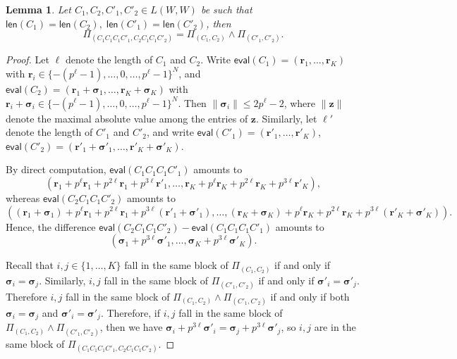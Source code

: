 \documentclass[letterpaper, 11pt, thm-restate]{article}
\numberwithin{equation}{section}
\newcommand{\br}{\boldsymbol{r}}
\newcommand{\bz}{\boldsymbol{z}}
\newcommand{\bsig}{\boldsymbol{\sigma}}
\newcommand{\len}{\mathsf{len}}
\newcommand{\eval}{\mathsf{eval}}
\newtheorem{lem}[thrm]{Lemma}
\theoremstyle{definition}
\theoremstyle{definition}
\theoremstyle{definition}
\begin{document}
\begin{lem}\label{lem:meet}
    Let $C_1, C_2, C'_1, C'_2 \in L(W, W)$ be such that $\len(C_1) = \len(C_2),\; \len(C'_1) = \len(C'_2)$, then
    \begin{equation*}
        \Pi_{(C_1C_1C_1C'_1, C_2C_1C_1C'_2)} = \Pi_{(C_1, C_2)} \wedge \Pi_{(C'_1, C'_2)}.
    \end{equation*}
\end{lem}
\begin{proof}
    Let $\ell$ denote the length of $C_1$ and $C_2$.
    Write $\eval(C_1) = (\br_1, \ldots, \br_K)$ with $\br_i \in \{-(p^{\ell}-1), \ldots, 0, \ldots, p^{\ell}-1\}^N$, and $\eval(C_2) = (\br_1 + \bsig_1, \ldots, \br_K + \bsig_K)$ with $\br_i + \bsig_i \in \{-(p^{\ell}-1), \ldots, 0, \ldots, p^{\ell}-1\}^N$.
    Then $\|\bsig_i\| \leq 2 p^{\ell} - 2$, where $\|\bz\|$ denote the maximal absolute value among the entries of $\bz$.
    Similarly, let $\ell'$ denote the length of $C'_1$ and $C'_2$, and write $\eval(C'_1) = (\br'_1, \ldots, \br'_K)$, $\eval(C'_2) = (\br'_1 + \bsig'_1, \ldots, \br'_K + \bsig'_K)$.

    By direct computation, $\eval(C_1C_1C_1C'_1)$ amounts to
    \[
    \left(\br_1 + p^{\ell} \br_1 + p^{2\ell} \br_1 + p^{3\ell} \br'_1, \ldots, \br_K + p^{\ell} \br_K + p^{2\ell} \br_K + p^{3\ell} \br'_K\right),
    \]
    whereas $\eval(C_2C_1C_1C'_2)$ amounts to
    \[
    \left((\br_1+\bsig_1) + p^{\ell} \br_1 + p^{2\ell} \br_1 + p^{3\ell} (\br'_1 + \bsig'_1), \ldots, (\br_K+\bsig_K) + p^{\ell} \br_K + p^{2\ell} \br_K + p^{3\ell} (\br'_K + \bsig'_K)\right).
    \]
    Hence, the difference $\eval(C_2C_1C_1C'_2) - \eval(C_1C_1C_1C'_1)$ amounts to
    \begin{equation}
    \left(\bsig_1 + p^{3\ell} \bsig'_1, \ldots, \bsig_K + p^{3\ell} \bsig'_K\right).
    \end{equation}
    
    Recall that $i, j \in \{1, \ldots, K\}$ fall in the same block of $\Pi_{(C_1, C_2)}$ if and only if $\bsig_i = \bsig_j$.
    Similarly, $i, j$ fall in the same block of $\Pi_{(C'_1, C'_2)}$ if and only if $\bsig'_i = \bsig'_j$.
    Therefore $i, j$ fall in the same block of $\Pi_{(C_1, C_2)} \wedge \Pi_{(C'_1, C'_2)}$ if and only if both $\bsig_i = \bsig_j$ and $\bsig'_i = \bsig'_j$.
    Therefore, if $i, j$ fall in the same block of $\Pi_{(C_1, C_2)} \wedge \Pi_{(C'_1, C'_2)}$, then we have $\bsig_i + p^{3\ell} \bsig'_i = \bsig_j + p^{3\ell} \bsig'_j$, so $i, j$ are in the same block of $\Pi_{(C_1C_1C_1C'_1, C_2C_1C_1C'_2)}$.
    

\end{proof}
\end{document}
